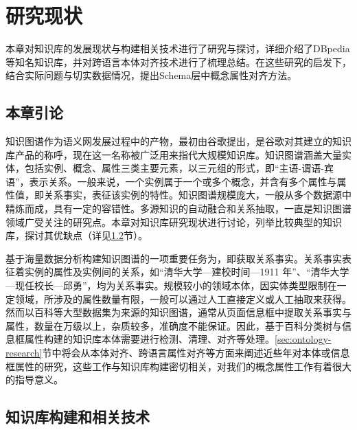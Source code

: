 \chapter{研究现状}
\label{cha:research}
本章对知识库的发展现状与构建相关技术进行了研究与探讨，详细介绍了DBpedia等知名知识库，并对跨语言本体对齐技术进行了梳理总结。在这些研究的启发下，结合实际问题与切实数据情况，提出Schema层中概念属性对齐方法。

\section{本章引论}

知识图谱作为语义网发展过程中的产物，最初由谷歌提出，是谷歌对其建立的知识库产品的称呼，现在这一名称被广泛用来指代大规模知识库。知识图谱涵盖大量实体，包括实例、概念、属性三类主要元素，以三元组的形式，即“主语-谓语-宾语”，表示关系。一般来说，一个实例属于一个或多个概念，并含有多个属性与属性值，即关系事实，表征该实例的特性。知识图谱规模庞大，一般从多个数据源中精炼而成，具有一定的容错性。多源知识的自动融合和关系抽取，一直是知识图谱领域广受关注的研究点。本章对知识库研究现状进行讨论，列举比较典型的知识库，探讨其优缺点（详见\ref{sec:knowledgebase-research}节）。

基于海量数据分析构建知识图谱的一项重要任务为，即获取关系事实\cite{suchanek2014knowledge}。关系事实表征着实例的属性及实例间的关系，如“清华大学—建校时间—1911 年”、“清华大学—现任校长—邱勇”，均为关系事实。规模较小的领域本体，因实体类型限制在一定领域，所涉及的属性数量有限，一般可以通过人工直接定义\cite{boyce2007developing}或人工抽取\cite{wang:movie}来获得。然而以百科等大型数据集为来源的知识图谱，通常从页面信息框中提取关系事实与属性，数量在万级以上，杂质较多，准确度不能保证。因此，基于百科分类树与信息框属性构建的知识库本体需要进行检测、清理、对齐等处理。\ref{sec:ontology-research}节中将会从本体对齐、跨语言属性对齐等方面来阐述近些年对本体或信息框属性的研究，这些工作与知识库构建密切相关，对我们的概念属性工作有着很大的指导意义。

\section{知识库构建和相关技术}
\label{sec:knowledgebase-research}

